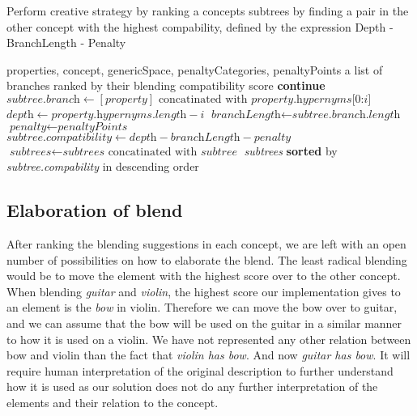 \begin{algorithm}
	\caption{Perform creative strategy by ranking a concepts subtrees by finding a pair in the other concept with the highest compability, defined by the expression Depth - BranchLength - Penalty}\label{alg:RankCompatibleBlendingSuggestions}
	\begin{algorithmic}[1]
		\Require properties,
		concept,
		genericSpace,
		penaltyCategories,
		penaltyPoints
		\Ensure a list of branches ranked by their blending compatibility score
		\State \textbf{continue}
		\EndIf
		\EndIf
		\State ${\textit{subtree.branch} \gets {[\textit{property}] \text{ concatinated with } \textit{property.hypernyms[0:i]}}}$
		\State ${\textit{depth} \gets {\textit{property.hypernyms.length} - i}}$
		\State ${\textit{branchLength} \gets {\textit{subtree.branch.length}}}$
		\State ${\textit{penalty} \gets \textit{penaltyPoints}}$
		\EndIf
		\State ${\textit{subtree.compatibility} \gets {\textit{depth} - \textit{branchLength} - \textit{penalty}}}$
		\State ${\textit{subtrees} \gets {\textit{subtrees} \text{ concatinated with } \textit{subtree}}}$
		\EndFor
		\EndFor
		\State \Return \textit{subtrees} \textbf{sorted} by \textit{subtree.compability} in descending order
	\EndProcedure
\end{algorithmic}
\end{algorithm}

\subsection{Elaboration of blend}
After ranking the blending suggestions in each concept, we are left with an open number of possibilities on how to elaborate the blend. The least radical blending would be to move the element with the highest score over to the other concept. When blending \emph{guitar} and \emph{violin}, the highest score our implementation gives to an element is the \emph{bow} in violin. Therefore we can move the bow over to guitar, and we can assume that the bow will be used on the guitar in a similar manner to how it is used on a violin. We have not represented any other relation between bow and violin than the fact that \emph{violin has bow}. And now \emph{guitar has bow}. It will require human interpretation of the original description to further understand how it is used as our solution does not do any further interpretation of the elements and their relation to the concept.

